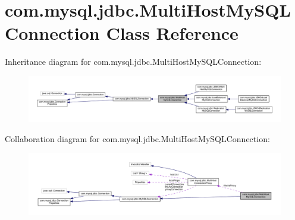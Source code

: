 \hypertarget{classcom_1_1mysql_1_1jdbc_1_1_multi_host_my_s_q_l_connection}{}\section{com.\+mysql.\+jdbc.\+Multi\+Host\+My\+S\+Q\+L\+Connection Class Reference}
\label{classcom_1_1mysql_1_1jdbc_1_1_multi_host_my_s_q_l_connection}


Inheritance diagram for com.\+mysql.\+jdbc.\+Multi\+Host\+My\+S\+Q\+L\+Connection\+:
\nopagebreak
\begin{figure}[H]
\begin{center}
\leavevmode
\includegraphics[width=350pt]{classcom_1_1mysql_1_1jdbc_1_1_multi_host_my_s_q_l_connection__inherit__graph}
\end{center}
\end{figure}


Collaboration diagram for com.\+mysql.\+jdbc.\+Multi\+Host\+My\+S\+Q\+L\+Connection\+:
\nopagebreak
\begin{figure}[H]
\begin{center}
\leavevmode
\includegraphics[width=350pt]{classcom_1_1mysql_1_1jdbc_1_1_multi_host_my_s_q_l_connection__coll__graph}
\end{center}
\end{figure}
